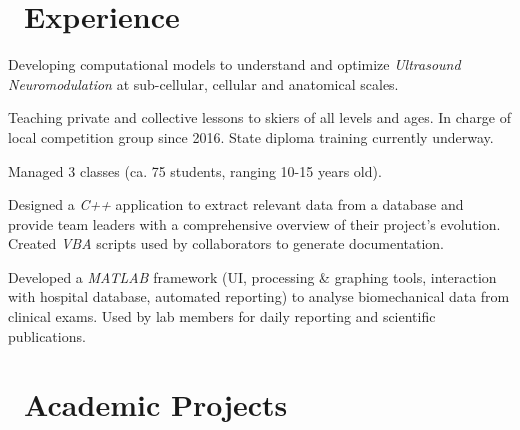 \documentclass[a4paper]{cv}
\begin{document}
\begin{minipage}[t]{0.6\textwidth}

\section{\texorpdfstring{\faBriefcase}\ \ Experience}\sectionline

Developing computational models to understand and optimize \emph{Ultrasound Neuromodulation} at sub-cellular, cellular and anatomical scales.
\sectionspace

Teaching private and collective lessons to skiers of all levels and ages. In charge of local competition group since 2016. State diploma training currently underway.
\sectionspace

Managed 3 classes (ca. 75 students, ranging 10-15 years old).
\sectionspace

Designed a \emph{C++} application to extract relevant data from a database and provide team leaders with a comprehensive overview of their project's evolution. Created \emph{VBA} scripts used by collaborators to generate documentation.
\sectionspace

Developed a \emph{MATLAB} framework (UI, processing \& graphing tools, interaction with hospital database, automated reporting) to analyse biomechanical data from clinical exams. Used by lab members for daily reporting and scientific publications.\sectionspace

\section{\texorpdfstring{\faClipboard} \ \ Academic Projects}\sectionline


\end{minipage}
\end{document}
